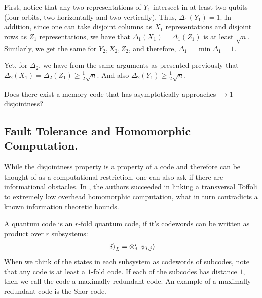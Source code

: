 \documentclass[manuscript,screen,review]{acmart}
\begin{document}
{\begin{enumerate}
First, notice that any two representations of $Y_{1}$ intersect in at least two qubits (four orbits, two horizontally and two vertically). Thus, $\Delta_{1}\left( Y_{1} \right) = 1$. In addition, since one can take disjoint columns as $X_{1}$ representations and disjoint rows as $Z_{1}$ representations, we have that $\Delta_{1}(X_1) = \Delta_{1}(Z_1)$ is at least $\sqrt{n}$. Similarly, we get the same for $Y_{2}, X_{2}, Z_{2}$, and therefore, $\Delta_{1} = \min \Delta_{1} = 1$.
    
Yet, for $\Delta_{2}$, we have from the same arguments as presented previously that $\Delta_{2}(X_{1}) = \Delta_{2}(Z_{1}) \ge \frac{1}{2}\sqrt{n}$. And also $\Delta_{2}(Y_{1}) \ge \frac{1}{2}\sqrt{n}$.

\end{enumerate}

  \begin{oproblem}
    Does there exist a memory code that has asymptotically approaches $\rightarrow 1$ disjointness? 
  \end{oproblem}



\subsection{Fault Tolerance and Homomorphic Computation.  }



While the disjointness property is a property of a code and therefore can be thought of as a computational restriction, one can also ask if there are informational obstacles. In \cite{newman2017limitationstransversalcomputationquantum}, the authors succeeded in linking a transversal Toffoli to extremely low overhead homomorphic computation, what in turn contradicts a known information theoretic bounds. 
\begin{definition}
  A quantum code is an $r$-fold quantum code, if it's codewords can be written as product over $r$ subsystems: 
  \begin{equation*}
    \begin{split}
      \ket{i}_{L} =  \otimes^{r}_{j}\ket{\psi_{i,j}}  
    \end{split}
  \end{equation*} When we think of the states in each subsystem as codewords of subcodes, note that any code is at least a $1$-fold code. If each of the subcodes has distance $1$, then we call the code a maximally redundant code. An example of a maximally redundant code is the Shor code.
\end{definition}

}
\end{document}
